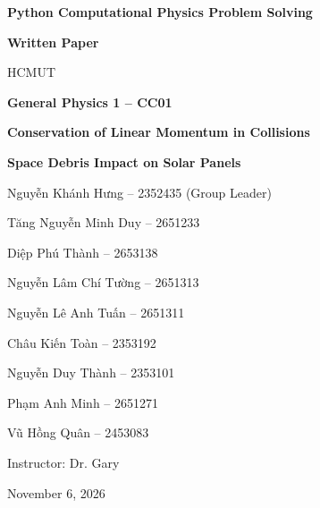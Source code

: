 \begin{titlepage}
\thispagestyle{empty}
\centering
\vspace*{1.5cm}

{\bfseries\fontsize{20pt}{26pt}\selectfont Python Computational Physics Problem Solving\par}
\vspace{0.6cm}
{\bfseries\fontsize{18pt}{24pt}\selectfont Written Paper\par}
\vspace{0.8cm}
{\fontsize{16pt}{20pt}\selectfont HCMUT\par}
\vspace{0.4cm}
{\bfseries\fontsize{16pt}{20pt}\selectfont General Physics 1 -- CC01\par}
\vspace{1.0cm}
{\bfseries\fontsize{18pt}{24pt}\selectfont Conservation of Linear Momentum in Collisions\par}
\vspace{0.4cm}
{\bfseries\fontsize{18pt}{24pt}\selectfont Space Debris Impact on Solar Panels\par}
\vspace{1.2cm}

Nguyễn Khánh Hưng -- 2352435 (Group Leader)\par
Tăng Nguyễn Minh Duy -- 2651233\par
Diệp Phú Thành -- 2653138\par
Nguyễn Lâm Chí Tường -- 2651313\par
Nguyễn Lê Anh Tuấn -- 2651311\par
Châu Kiến Toàn -- 2353192\par
Nguyễn Duy Thành -- 2353101\par
Phạm Anh Minh -- 2651271\par
Vũ Hồng Quân -- 2453083\par
\vspace{1.0cm}

Instructor: Dr. Gary\par
\vspace{0.4cm}
November 6, 2026\par
\end{titlepage}
\setcounter{page}{1}
